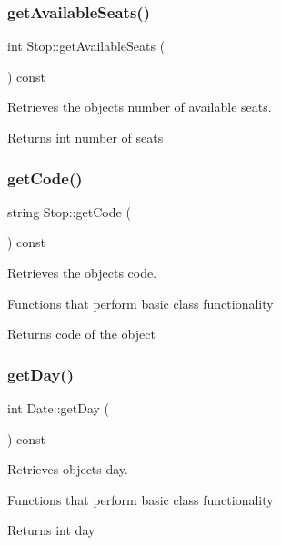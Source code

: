 \subsubsection{\texorpdfstring{get\+Available\+Seats()}{getAvailableSeats()}}
{\footnotesize\ttfamily int Stop\+::get\+Available\+Seats (\begin{DoxyParamCaption}{ }\end{DoxyParamCaption}) const}



Retrieves the object\textquotesingle{}s number of available seats. 

\begin{DoxyReturn}{Returns}
int number of seats 
\end{DoxyReturn}
\mbox{\label{group___date_ga4c0a7bb72ca7a054a394d13fc8cd9bde}} 
\subsubsection{\texorpdfstring{get\+Code()}{getCode()}}
{\footnotesize\ttfamily string Stop\+::get\+Code (\begin{DoxyParamCaption}{ }\end{DoxyParamCaption}) const}



Retrieves the object\textquotesingle{}s code. 

Functions that perform basic class functionality \begin{DoxyReturn}{Returns}
code of the object 
\end{DoxyReturn}
\mbox{\label{group___date_ga0f253815240e70f4c39cb93cc68bd3f4}} 
\subsubsection{\texorpdfstring{get\+Day()}{getDay()}}
{\footnotesize\ttfamily int Date\+::get\+Day (\begin{DoxyParamCaption}{ }\end{DoxyParamCaption}) const}



Retrieves object\textquotesingle{}s day. 

Functions that perform basic class functionality \begin{DoxyReturn}{Returns}
int day 
\end{DoxyReturn}
\mbox{\label{group___date_ga332f6e3a2f6a40d73742b6dab7be0f64}} 
